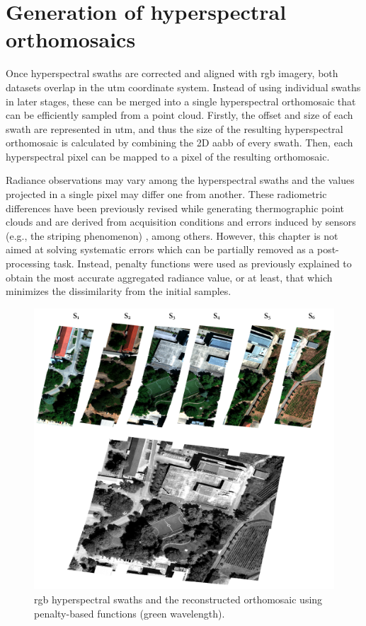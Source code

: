 \section{Generation of hyperspectral orthomosaics}

Once hyperspectral swaths are corrected and aligned with \acrshort{rgb} imagery, both datasets overlap in the \acrshort{utm} coordinate system. Instead of using individual swaths in later stages, these can be merged into a single hyperspectral orthomosaic that can be efficiently sampled from a point cloud. Firstly, the offset and size of each swath are represented in \acrshort{utm}, and thus the size of the resulting hyperspectral orthomosaic is calculated by combining the 2D \acrshort{aabb} of every swath. Then, each hyperspectral pixel can be mapped to a pixel of the resulting orthomosaic. 

Radiance observations may vary among the hyperspectral swaths and the values projected in a single pixel may differ one from another. These radiometric differences have been previously revised while generating thermographic point clouds and are derived from acquisition conditions and errors induced by sensors (e.g., the striping phenomenon) \cite{pu_hyperspectral_2017}, among others. However, this chapter is not aimed at solving systematic errors which can be partially removed as a post-processing task. Instead, penalty functions were used as previously explained to obtain the most accurate aggregated radiance value, or at least, that which minimizes the dissimilarity from the initial samples. 

\begin{figure}[bt]
    \centering
    \includegraphics[width=.97\linewidth]{figs/hyper_point_cloud/orthomosaic.png}
	\caption{\acrshort{rgb} hyperspectral swaths and the reconstructed orthomosaic using penalty-based functions (green wavelength). }
	\label{fig:hyper_band_fusion}
\end{figure}

